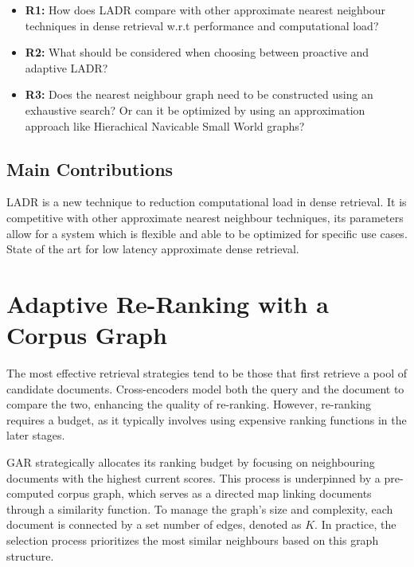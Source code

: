\documentclass[sigconf,authorversion,nonacm]{acmart}
\begin{document}
\begin{itemize}

	\item \textbf{R1:} How does LADR compare with other approximate nearest neighbour techniques in
	      dense retrieval w.r.t performance and computational load?

	\item \textbf{R2:} What should be considered when choosing between proactive and adaptive LADR?

	\item \textbf{R3:} Does the nearest neighbour graph need to be constructed using an exhaustive
	      search? Or can it be optimized by using an approximation approach like Hierachical
	      Navicable Small World graphs?\cite{hnsw}

\end{itemize}


\subsection{Main Contributions}

LADR is a new technique to reduction computational load in dense retrieval. It is competitive with
other approximate nearest neighbour techniques, its parameters allow for a system which is flexible
and able to be optimized for specific use cases. State of the art for low latency approximate dense
retrieval.

\section{Adaptive Re-Ranking with a Corpus Graph}

The most effective retrieval strategies tend to be those that first retrieve a pool of candidate
documents. Cross-encoders model both the query and the document to compare the two, enhancing the
quality of re-ranking. However, re-ranking requires a budget, as it typically involves using
expensive ranking functions in the later stages.

GAR strategically allocates its ranking budget by focusing on neighbouring documents with the highest
current scores. This process is underpinned by a pre-computed corpus graph, which serves as a
directed map linking documents through a similarity function. To manage the graph's size and
complexity, each document is connected by a set number of edges, denoted as \(K\). In practice, the
selection process prioritizes the most similar neighbours based on this graph structure.
\end{document}
